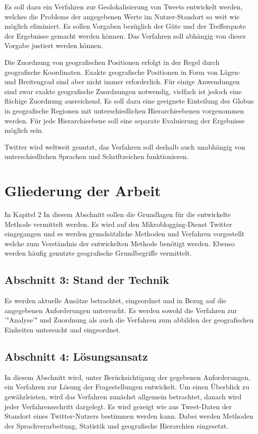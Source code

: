 		Es soll dazu ein Verfahren zur Geolokalisierung von Tweets entwickelt werden, welches die Probleme der angegebenen Werte im Nutzer-Standort so weit wie möglich eliminiert.
		Es sollen Vorgaben bezüglich der Güte und der Trefferquote der Ergebnisse gemacht werden können.
		Das Verfahren soll abhängig von dieser Vorgabe justiert werden können.

		Die Zuordnung von geografischen Positionen erfolgt in der Regel durch geografische Koordinaten.
		Exakte geografische Positionen in Form von Lägen- und Breitengrad sind aber nicht immer erforderlich. 
		Für einige Anwendungen sind zwar exakte geografische Zuordnungen notwendig, vielfach ist jedoch eine flächige Zuordnung ausreichend. 
		Es soll dazu eine geeignete Einteilung des Globus in geografische Regionen mit unterschiedlichen Hierarchieebenen vorgenommen werden.
		Für jede Hierarchieebene soll eine separate Evaluierung der Ergebnisse möglich sein.

		Twitter wird weltweit genutzt, das Verfahren soll deshalb auch unabhängig von unterschiedlichen Sprachen und Schriftzeichen funktionieren.
	
	\section{Gliederung der Arbeit}

			In Kapitel 2 
			In diesem Abschnitt sollen die Grundlagen für die entwickelte Methode vermittelt werden. 
			Es wird auf den Mikroblogging-Dienst Twitter eingegangen und es werden grundsätzliche Methoden und Verfahren vorgestellt welche zum Verständnis der entwickelten Methode benötigt werden. 
			Ebenso werden häufig genutzte geografische Grundbegriffe vermittelt.

		\subsection*{Abschnitt 3: Stand der Technik}
			Es werden aktuelle Ansätze betrachtet, eingeordnet und in Bezug auf die angegebenen Anforderungen untersucht.
			Es werden sowohl die Verfahren zur '"Analyse'" und Zuordnung als auch die Verfahren zum abbilden der geografischen Einheiten untersucht und eingeordnet. 

		\subsection*{Abschnitt 4: Lösungsansatz}
			In diesem Abschnitt wird, unter Berücksichtigung der gegebenen Anforderungen, ein Verfahren zur Lösung der Fragestellungen entwickelt. 
			Um einen Überblick zu gewährleisten, wird das Verfahren zunächst allgemein betrachtet, danach wird jeder Verfahrensschritt dargelegt.
			Es wird gezeigt wie aus Tweet-Daten der Standort eines Twitter-Nutzers bestimmen werden kann.
			Dabei werden Methoden der Sprachverarbeitung, Statistik und geografische Hierarchien eingesetzt. 

